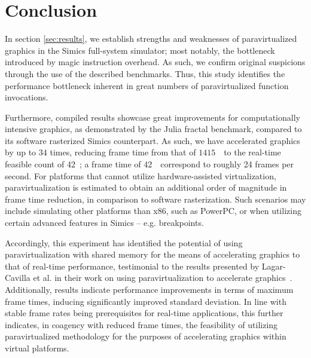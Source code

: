
\section{Conclusion}
\label{sec:conclusion}
In section \ref{sec:results}, we establish strengths and weaknesses of paravirtualized graphics in the Simics full-system simulator; most notably, the bottleneck introduced by magic instruction overhead.
As such, we confirm original suspicions through the use of the described benchmarks.
Thus, this study identifies the performance bottleneck inherent in great numbers of paravirtualized function invocations.

Furthermore, compiled results showcase great improvements for computationally intensive graphics, as demonstrated by the Julia fractal benchmark, compared to its software rasterized Simics counterpart.
As such, we have accelerated graphics by up to $34$ times, reducing frame time from that of $1415$~\milli\second\ to the real-time feasible count of 42~\milli\second ; a frame time of 42~\milli\second\ correspond to roughly 24 frames per second.
For platforms that cannot utilize hardware-assisted virtualization, paravirtualization is estimated to obtain an additional order of magnitude in frame time reduction, in comparison to software rasterization.
Such scenarios may include simulating other platforms than x86, such as PowerPC, or when utilizing certain advanced features in Simics -- e.g. breakpoints.

Accordingly, this experiment has identified the potential of using paravirtualization with shared memory for the means of accelerating graphics to that of real-time performance, testimonial to the results presented by Lagar-Cavilla et al. in their work on using paravirtualization to accelerate graphics~.
Additionally, results indicate performance improvements in terms of maximum frame times, inducing significantly improved standard deviation.
In line with stable frame rates being prerequisites for real-time applications, this further indicates, in coagency with reduced frame times, the feasibility of utilizing paravirtualized methodology for the purposes of accelerating graphics within virtual platforms.

